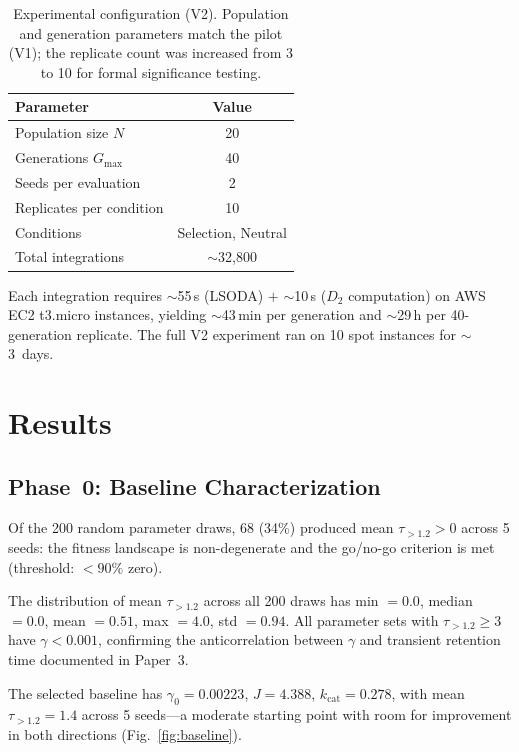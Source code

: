 \documentclass[twocolumn,showpacs,preprintnumbers,amsmath,amssymb,prd,floatfix]{revtex4-2}
\newcommand{\tauexp}{\tau_{>1.2}}
\newcommand{\Dtwo}{D_2}
\newcommand{\kcat}{k_{\mathrm{cat}}}
\begin{document}
\begin{table}[b]
\centering
\caption{Experimental configuration (V2). Population and generation parameters match the pilot (V1); the replicate count was increased from 3 to 10 for formal significance testing.}
\label{tab:config}
\begin{tabular}{lc}
\toprule
Parameter & Value \\
\midrule
Population size $N$ & 20 \\
Generations $G_\text{max}$ & 40 \\
Seeds per evaluation & 2 \\
Replicates per condition & 10 \\
Conditions & Selection, Neutral \\
Total integrations & $\sim$32{,}800 \\
\bottomrule
\end{tabular}
\end{table}

Each integration requires $\sim$55\,s (LSODA) $+$ $\sim$10\,s ($\Dtwo$ computation) on AWS EC2 t3.micro instances, yielding $\sim$43\,min per generation and $\sim$29\,h per 40-generation replicate. The full V2 experiment ran on 10 spot instances for $\sim$3~days.

\section{Results}
\label{sec:results}

\subsection{Phase~0: Baseline Characterization}

Of the 200 random parameter draws, 68 (34\%) produced mean $\tauexp > 0$ across 5 seeds: the fitness landscape is non-degenerate and the go/no-go criterion is met (threshold: $< 90\%$ zero).

The distribution of mean $\tauexp$ across all 200 draws has min $= 0.0$, median $= 0.0$, mean $= 0.51$, max $= 4.0$, std $= 0.94$. All parameter sets with $\tauexp \geq 3$ have $\gamma < 0.001$, confirming the anticorrelation between $\gamma$ and transient retention time documented in Paper~3.

The selected baseline has $\gamma_0 = 0.00223$, $J = 4.388$, $\kcat = 0.278$, with mean $\tauexp = 1.4$ across 5 seeds---a moderate starting point with room for improvement in both directions (Fig.~\ref{fig:baseline}).
\end{document}
